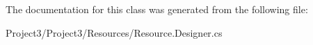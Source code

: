 The documentation for this class was generated from the following file\+:\begin{DoxyCompactItemize}
\item 
Project3/\+Project3/\+Resources/Resource.\+Designer.\+cs\end{DoxyCompactItemize}
